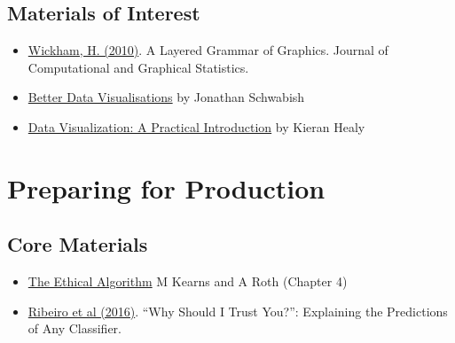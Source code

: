 \documentclass[
  12pt,
]{book}
\providecommand{\tightlist}{%
  \setlength{\itemsep}{0pt}\setlength{\parskip}{0pt}}
\begin{document}
\hypertarget{materials-of-interest-2}{%
\subsection*{Materials of Interest}\label{materials-of-interest-2}}

\begin{itemize}
\item
  \href{https://library-search.imperial.ac.uk/discovery/fulldisplay?docid=cdi_informaworld_taylorfrancis_310_1198_jcgs_2009_07098\&context=PC\&vid=44IMP_INST:ICL_VU1\&lang=en\&search_scope=MyInst_and_CI\&adaptor=Primo\%20Central\&tab=Everything\&query=any,contains,layered\%20grammar\%20of\%20graphics\&offset=0}{Wickham, H. (2010)}. A Layered Grammar of Graphics. Journal of Computational and Graphical Statistics.
\item
  \href{https://library-search.imperial.ac.uk/discovery/fulldisplay?docid=alma991000664639501591\&context=L\&vid=44IMP_INST:ICL_VU1\&lang=en\&search_scope=MyInst_and_CI\&adaptor=Local\%20Search\%20Engine\&tab=Everything\&query=any,contains,better\%20data\%20visualisations\&offset=0}{Better Data Visualisations} by Jonathan Schwabish
\end{itemize}

\begin{itemize}
\tightlist
\item
  \href{https://library-search.imperial.ac.uk/discovery/fulldisplay?docid=alma991000211295101591\&context=L\&vid=44IMP_INST:ICL_VU1\&lang=en\&search_scope=MyInst_and_CI\&adaptor=Local\%20Search\%20Engine\&tab=Everything\&query=any,contains,Data\%20Visualization\%20\%E2\%80\%93\%20A\%20Practical\%20Introduction\&offset=0}{Data Visualization: A Practical Introduction} by Kieran Healy
\end{itemize}

\hypertarget{production-reading}{%
\section{Preparing for Production}\label{production-reading}}

\hypertarget{core-materials-3}{%
\subsection*{Core Materials}\label{core-materials-3}}

\begin{itemize}
\item
  \href{https://library-search.imperial.ac.uk/discovery/fulldisplay?docid=alma991000531083101591\&context=L\&vid=44IMP_INST:ICL_VU1\&lang=en\&search_scope=MyInst_and_CI\&adaptor=Local\%20Search\%20Engine\&tab=Everything\&query=any,contains,kearns\%20and\%20roth\&mode=Basic}{The Ethical Algorithm} M Kearns and A Roth (Chapter 4)
\item
  \href{https://arxiv.org/abs/1602.04938}{Ribeiro et al (2016)}. ``Why Should I Trust You?'': Explaining the Predictions of Any Classifier.
\end{itemize}
\end{document}
